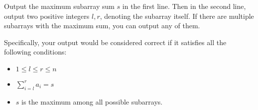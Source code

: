 Output the maximum subarray sum $s$ in the first line.
Then in the second line, output two positive integers $l, r$, denoting the subarray itself.
If there are multiple subarrays with the maximum sum, you can output any of them.

Specifically, your output would be considered correct if it satisfies all the following conditions:
\begin{itemize}
    \item $1 \leq l \leq r \leq n$
    \item $\sum_{i = l}^{r} a_i = s$
    \item $s$ is the maximum among all possible subarrays.
\end{itemize}
